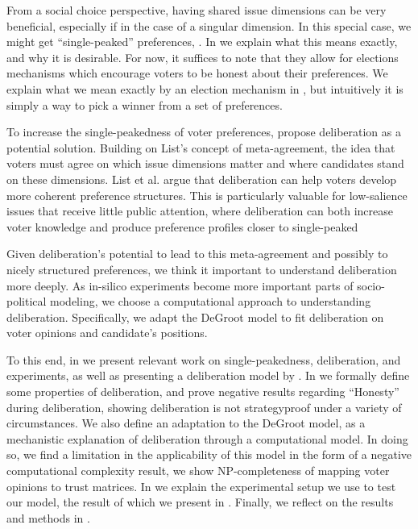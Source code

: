 From a social choice perspective, having shared issue dimensions can be very beneficial, especially if
in the case of a singular dimension. In this special case, we
might get ``single-peaked'' preferences, . In  we explain what
this means exactly, and why it is desirable. For now, it
suffices to note that they allow for elections mechanisms which encourage
voters to be honest about their preferences. We explain what we mean exactly by
an election mechanism in , but intuitively it is
simply a way to pick a winner from a set of preferences.

To increase the single-peakedness of voter preferences,
\citet{listDeliberationSinglePeakednessPossibility2013} propose deliberation
as a potential solution. Building on List's \cite{listTwoConceptsAgreement2002}
concept of meta-agreement, the idea that voters must agree on which issue
dimensions matter and where candidates stand on these dimensions. List et al. argue
that deliberation can help voters develop more coherent preference structures.
This is particularly valuable for low-salience issues that receive little
public attention, where deliberation can both increase voter knowledge and
produce preference profiles closer to single-peaked

Given deliberation's potential to lead to this meta-agreement and possibly to
nicely structured preferences, we think it important to understand
deliberation more deeply.  As in-silico experiments become more important parts
of socio-political modeling, we choose a computational approach to
understanding deliberation. Specifically, we adapt the DeGroot model
\cite{degrootReachingConsensus1974} to fit deliberation on voter opinions and
candidate's positions.

To this end, in  we present relevant work on
single-peakedness, deliberation, and experiments, as well as presenting a
deliberation model by \citet{radDeliberationSinglePeakednessCoherent2021}. In
 we formally define some properties of deliberation, and prove
negative results regarding ``Honesty'' during deliberation, showing
deliberation is not strategyproof under a variety of circumstances. We also
define an adaptation to the DeGroot model, as a mechanistic explanation of
deliberation through a computational model. In doing so, we find a limitation
in the applicability of  this model in the form of a negative computational
complexity result, we show NP-completeness of mapping voter opinions to trust
matrices. In  we explain the experimental setup we use to test
our model, the result of which we present in .
Finally, we reflect on the results and methods in .

